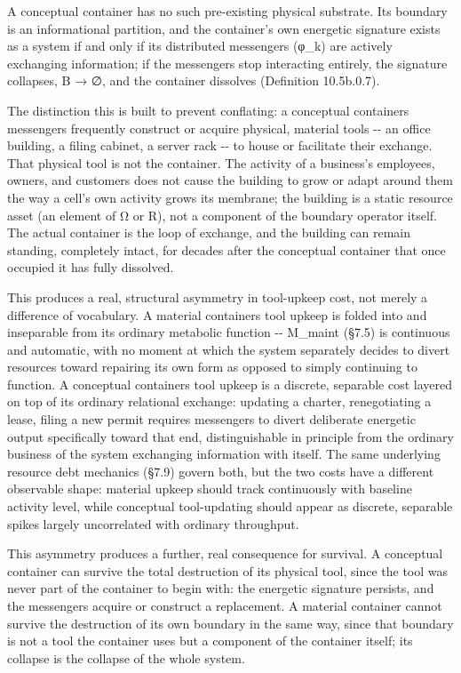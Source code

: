 \documentclass[
]{article}
\begin{document}
A conceptual container has no such pre-existing physical substrate. Its
boundary is an informational partition, and the container's own energetic
signature exists as a system if and only if its distributed messengers
(φ\_k) are actively exchanging information; if the messengers stop
interacting entirely, the signature collapses, B → ∅, and the container
dissolves (Definition 10.5b.0.7).

The distinction this is built to prevent conflating: a conceptual
containers messengers frequently construct or acquire physical, material
tools -\/- an office building, a filing cabinet, a server rack -\/- to
house or facilitate their exchange. That physical tool is not the
container. The activity of a business's employees, owners, and customers
does not cause the building to grow or adapt around them the way a cell's
own activity grows its membrane; the building is a static resource asset
(an element of Ω or R), not a component of the boundary operator itself.
The actual container is the loop of exchange, and the building can
remain standing, completely intact, for decades after the conceptual
container that once occupied it has fully dissolved.

This produces a real, structural asymmetry in tool-upkeep cost, not
merely a difference of vocabulary. A material containers tool upkeep is
folded into and inseparable from its ordinary metabolic function -\/-
M\_maint (§7.5) is continuous and automatic, with no moment at which the
system separately decides to divert resources toward repairing its own
form as opposed to simply continuing to function. A conceptual
containers tool upkeep is a discrete, separable cost layered on top of
its ordinary relational exchange: updating a charter, renegotiating a
lease, filing a new permit requires messengers to divert deliberate
energetic output specifically toward that end, distinguishable in
principle from the ordinary business of the system exchanging
information with itself. The same underlying resource debt mechanics
(§7.9) govern both, but the two costs have a different observable shape:
material upkeep should track continuously with baseline activity level,
while conceptual tool-updating should appear as discrete, separable
spikes largely uncorrelated with ordinary throughput.

This asymmetry produces a further, real consequence for survival. A
conceptual container can survive the total destruction of its physical
tool, since the tool was never part of the container to begin with: the
energetic signature persists, and the messengers acquire or construct a
replacement. A material container cannot survive the destruction of its
own boundary in the same way, since that boundary is not a tool the
container uses but a component of the container itself; its collapse is
the collapse of the whole system.
\end{document}
